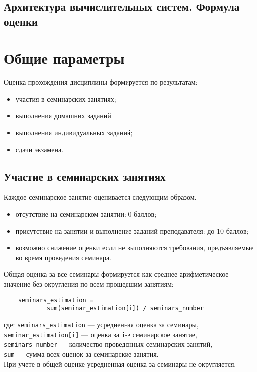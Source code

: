 \documentclass[a4paper, 12pt, oneside]{article}
\begin{document}
\begin{center}
\section*{Архитектура вычислительных систем. Формула оценки}
\end{center}

\section{Общие параметры}

Оценка прохождения дисциплины формируется по результатам:
\begin{itemize}
    \item участия в семинарских занятиях;
    \item выполнения домашних заданий
    \item выполнения индивидуальных заданий;
    \item сдачи экзамена.
\end{itemize}

\subsection{Участие в семинарских занятиях}

Каждое семинарское занятие оценивается следующим образом.

\begin{itemize}
    \item отсутствие на семинарском занятии: 0 баллов;
    \item присутствие на занятии и выполнение заданий преподавателя: до 10 баллов;
    \item возможно снижение оценки если не выполняются требования, предъявляемые во время проведения семинара.
\end{itemize}

Общая оценка за все семинары формируется как среднее арифметическое значение без округления по всем прошедшим занятиям:

\begin{verbatim}
    seminars_estimation =
            sum(seminar_estimation[i]) / seminars_number
\end{verbatim}
где: \verb|seminars_estimation| --- усредненная оценка за семинары,\\ \verb|seminar_estimation[i]| --- оценка за \verb|i|-е семинарское занятие,\\ \verb|seminars_number| --- количество проведенных семинарских занятий,\\
\verb|sum| --- сумма всех оценок за семинарские занятия.\\
При учете в общей оценке усредненная оценка за семинары не округляется.
\end{document}
